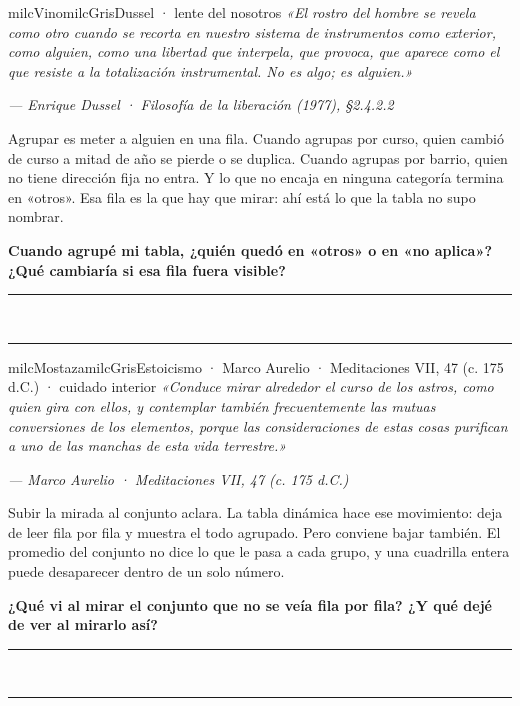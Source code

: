 \documentclass[11pt,letterpaper]{article}
\newcommand{\linead}[1]{\noindent\color{milcLinea}\rule{#1}{0.5pt}\color{milcNegro}}
\begin{document}
\begin{softbox}{milcVino}{milcGris}{Dussel · lente del nosotros}
\textit{«El rostro del hombre se revela como otro cuando se recorta en nuestro sistema de instrumentos como exterior, como alguien, como una libertad que interpela, que provoca, que aparece como el que resiste a la totalización instrumental. No es algo; es alguien.»}

{\footnotesize\itshape\color{milcNegro!70}--- Enrique Dussel · Filosofía de la liberación (1977), §2.4.2.2}

Agrupar es meter a alguien en una fila. Cuando agrupas por curso, quien cambió de curso a mitad de año se pierde o se duplica. Cuando agrupas por barrio, quien no tiene dirección fija no entra. Y lo que no encaja en ninguna categoría termina en «otros». Esa fila es la que hay que mirar: ahí está lo que la tabla no supo nombrar.

\textbf{Cuando agrupé mi tabla, ¿quién quedó en «otros» o en «no aplica»? ¿Qué cambiaría si esa fila fuera visible?}
\end{softbox}
\linead{\linewidth}\\[1mm]
\linead{\linewidth}

\begin{softbox}{milcMostaza}{milcGris}{Estoicismo · Marco Aurelio · Meditaciones VII, 47 (c. 175 d.C.) · cuidado interior}
\textit{«Conduce mirar alrededor el curso de los astros, como quien gira con ellos, y contemplar también frecuentemente las mutuas conversiones de los elementos, porque las consideraciones de estas cosas purifican a uno de las manchas de esta vida terrestre.»}

{\footnotesize\itshape\color{milcNegro!70}--- Marco Aurelio · Meditaciones VII, 47 (c. 175 d.C.)}

Subir la mirada al conjunto aclara. La tabla dinámica hace ese movimiento: deja de leer fila por fila y muestra el todo agrupado. Pero conviene bajar también. El promedio del conjunto no dice lo que le pasa a cada grupo, y una cuadrilla entera puede desaparecer dentro de un solo número.

\textbf{¿Qué vi al mirar el conjunto que no se veía fila por fila? ¿Y qué dejé de ver al mirarlo así?}
\end{softbox}
\linead{\linewidth}\\[1mm]
\linead{\linewidth}
\end{document}
